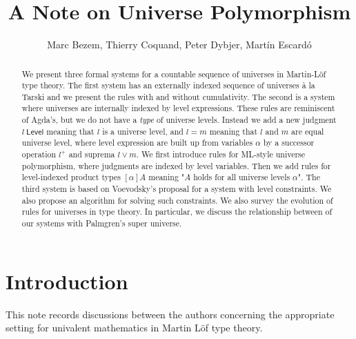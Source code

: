 \documentclass[11pt,a4paper]{article}
\def\Level{\mathsf{Level}}
\begin{document}
\title{A Note on Universe Polymorphism}

\author{Marc Bezem, Thierry Coquand, Peter Dybjer, Mart\'in Escard\'o}
\date{}
\maketitle

\begin{abstract}
We present three formal systems for a countable sequence of universes in Martin-Löf type theory. The first system has an externally indexed sequence of universes \`a la Tarski and we present the rules with and without cumulativity. The second is a system where universes are internally indexed by level expressions. These rules are reminiscent of Agda's, but we do not have a {\em type} of universe levels. Instead we add a new judgment $l\ \Level$ meaning that $l$ is a universe level, and $l = m$ meaning that $l$ and $m$ are equal universe level, where level expression are built up from variables $\alpha$ by a successor operation $l^+$ and suprema $l \vee m$. We first introduce rules for ML-style universe polymorphism, where judgments are indexed by level variables. Then we add rules for level-indexed product types $[\alpha]A$ meaning "$A$ holds for all universe levels $\alpha$". The third system is based on Voevodsky's proposal for a system with level constraints. We also propose an algorithm for solving such constraints. We also survey the evolution of rules for universes in type theory. In particular, we discuss the relationship between of our systems with Palmgren's super universe.
\end{abstract}

\section{Introduction}

This note records discussions between the authors concerning the appropriate setting for univalent mathematics in Martin Löf type theory.
\end{document}
